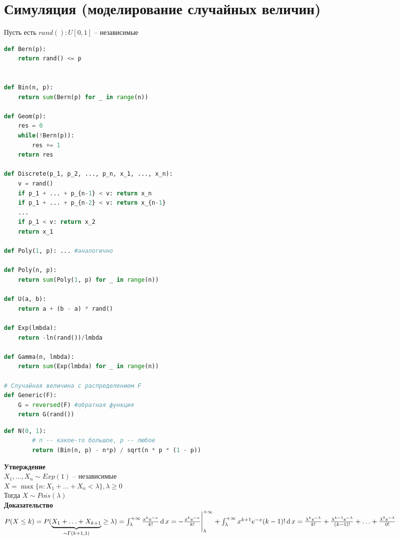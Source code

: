 \documentclass[12pt]{article}
\begin{document}
\section{Симуляция (моделирование случайных величин)}
Пусть есть $rand(): U[0, 1]$ -- независимые\\
\begin{lstlisting}[language=python]
def Bern(p): 
    return rand() <= p


def Bin(n, p): 
    return sum(Bern(p) for _ in range(n))

def Geom(p): 
    res = 0
    while(!Bern(p)):
        res += 1
    return res

def Discrete(p_1, p_2, ..., p_n, x_1, ..., x_n):
    v = rand()
    if p_1 + ... + p_{n-1} < v: return x_n
    if p_1 + ... + p_{n-2} < v: return x_{n-1}
    ...
    if p_1 < v: return x_2
    return x_1

def Poly(1, p): ... #аналогично

def Poly(n, p):
    return sum(Poly(1, p) for _ in range(n))

def U(a, b):
    return a + (b - a) * rand()

def Exp(lmbda):
    return -ln(rand())/lmbda

def Gamma(n, lmbda):
    return sum(Exp(lmbda) for _ in range(n))

# Случайная величина с распределением F
def Generic(F):
    G = reversed(F) #обратная функция
    return G(rand())
\end{lstlisting}
\begin{lstlisting}[language=python]
    def N(0, 1):
        # n -- какое-то большое, p -- любое
        return (Bin(n, p) - n*p) / sqrt(n * p * (1 - p))
\end{lstlisting}

\textbf{Утверждение}\\
$X_1, \ldots, X_n \sim Exp(1)$ -- независимые\\
$X = \max\{n: X_1 + \ldots + X_n < \lambda\}, \lambda \geq 0$\\
Тогда $X \sim Pois(\lambda)$\\
\textbf{Доказательство}\\
$P(X \leq k) = P(\ub{\sim \Gamma(k+1, 1)}{X_1 + \ldots + X_{k+1}} \geq \lambda) = \int_\lambda^{+\infty} \frac{x^k e^{-x}}{k!}\df x = -\frac{x^k e^{-x}}{k!} \vl_\lambda^{+\infty} + \int_\lambda^{+\infty} x^{k+1}e^{-x}{(k-1)!}\df x = \frac{\lambda^k e^{-\lambda}}{k!} + \frac{\lambda^{k-1} e^{-\lambda}}{(k-1)!} + \ldots + \frac{\lambda^0 e^{-\lambda}}{0!}$\\
\end{document}
